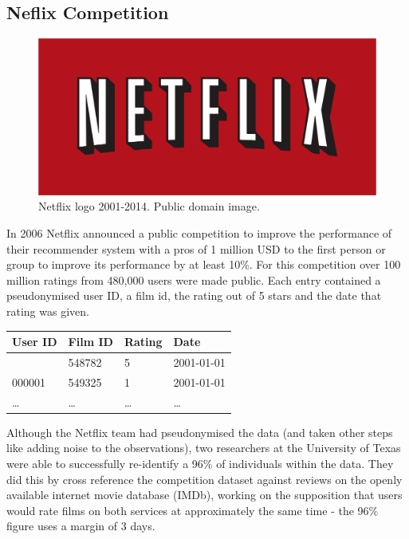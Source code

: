 \documentclass[
  letterpaper,
  DIV=11,
  numbers=noendperiod]{scrreprt}
\begin{document}
\subsection{Neflix Competition}\label{neflix-competition}

\begin{figure}[H]

{\centering \includegraphics{images/501-ethics-privacy/netflix-logo-old.png}

}

\caption{Netflix logo 2001-2014. Public domain image.}

\end{figure}%

In 2006 Netflix announced a public competition to improve the
performance of their recommender system with a pros of 1 million USD to
the first person or group to improve its performance by at least 10\%.
For this competition over 100 million ratings from 480,000 users were
made public. Each entry contained a pseudonymised user ID, a film id,
the rating out of 5 stars and the date that rating was given.

\begin{longtable}[]{@{}llll@{}}
\toprule\noalign{}
\textbf{User ID} & \textbf{Film ID} & \textbf{Rating} & \textbf{Date} \\
\midrule\noalign{}
\endhead
\bottomrule\noalign{}
\endlastfoot
000001 & 548782 & 5 & 2001-01-01 \\
000001 & 549325 & 1 & 2001-01-01 \\
\ldots{} & \ldots{} & \ldots{} & \ldots{} \\
\end{longtable}

Although the Netflix team had pseudonymised the data (and taken other
steps like adding noise to the observations), two researchers at the
University of Texas were able to successfully re-identify a 96\% of
individuals within the data. They did this by cross reference the
competition dataset against reviews on the openly available internet
movie database (IMDb), working on the supposition that users would rate
films on both services at approximately the same time - the 96\% figure
uses a margin of 3 days.
\end{document}
